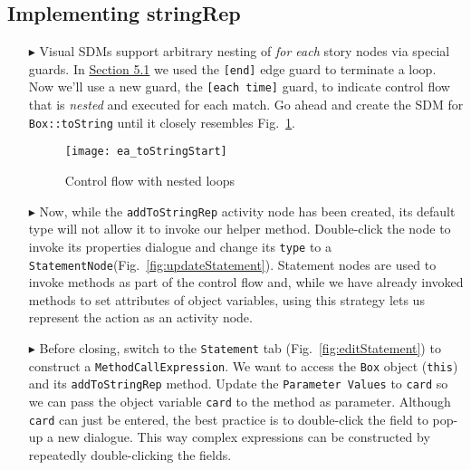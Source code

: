 \newpage
\hypertarget{stringRep vis}{}
\subsection{Implementing stringRep}
\visHeader

\begin{itemize}

\item[$\blacktriangleright$] Visual SDMs support arbitrary nesting of \emph{for each} story nodes via special guards. In \hyperlink{emptyPartition vis}{Section
5.1} we used the \texttt{[end]} edge guard to terminate a loop. Now we'll use a new guard, the \texttt{[each time]} guard, to indicate control flow that is \emph{nested} and
executed for each match. Go ahead and create the SDM for \texttt{Box::toString} until it closely resembles Fig.~\ref{fig:sdm_tostring_1}. 

\vspace{0.5cm}

\begin{figure}[htbp]
\begin{center}
  \texttt{[image: ea\_toStringStart]}
  \caption{Control flow with nested loops} 
  \label{fig:sdm_tostring_1}
\end{center}
\end{figure}

\clearpage

\item[$\blacktriangleright$] Now, while the \texttt{addToStringRep} activity node has been created, its default type will not allow it to invoke our helper
method. Double-click the node to invoke its properties dialogue and change its \texttt{type} to a \texttt{StatementNode}(Fig.~\ref{fig:updateStatement}). Statement nodes are used to invoke methods as part of the control flow and, while we have already invoked methods to set
attributes of object variables, using this strategy lets us represent the action as an activity node.

\vspace{0.5cm}

\item[$\blacktriangleright$] Before closing, switch to the \texttt{Statement} tab (Fig.~\ref{fig:editStatement}) to construct a \texttt{MethodCallExpression}.
We want to access the \texttt{Box} object (\texttt{this}) and its \texttt{addToStringRep} method. Update the \texttt{Parameter Values} to \texttt{card} so we
can pass the object variable \texttt{card} to the method as parameter. Although \texttt{card} can just be entered, the best practice is to double-click the
field to pop-up a new dialogue. This way complex expressions can be constructed by repeatedly double-clicking the fields.


\end{itemize}
